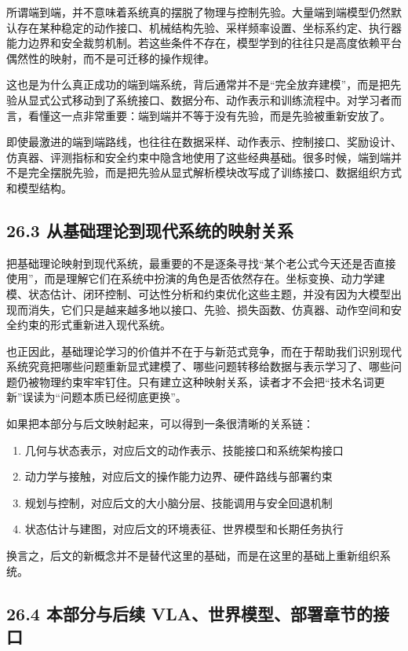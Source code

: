 所谓端到端，并不意味着系统真的摆脱了物理与控制先验。大量端到端模型仍然默认存在某种稳定的动作接口、机械结构先验、采样频率设置、坐标系约定、执行器能力边界和安全裁剪机制。若这些条件不存在，模型学到的往往只是高度依赖平台偶然性的映射，而不是可迁移的操作规律。

这也是为什么真正成功的端到端系统，背后通常并不是“完全放弃建模”，而是把先验从显式公式移动到了系统接口、数据分布、动作表示和训练流程中。对学习者而言，看懂这一点非常重要：端到端并不等于没有先验，而是先验被重新安放了。

即使最激进的端到端路线，也往往在数据采样、动作表示、控制接口、奖励设计、仿真器、评测指标和安全约束中隐含地使用了这些经典基础。很多时候，端到端并不是完全摆脱先验，而是把先验从显式解析模块改写成了训练接口、数据组织方式和模型结构。

\subsection*{26.3 从基础理论到现代系统的映射关系}


把基础理论映射到现代系统，最重要的不是逐条寻找“某个老公式今天还是否直接使用”，而是理解它们在系统中扮演的角色是否依然存在。坐标变换、动力学建模、状态估计、闭环控制、可达性分析和约束优化这些主题，并没有因为大模型出现而消失，它们只是越来越多地以接口、先验、损失函数、仿真器、动作空间和安全约束的形式重新进入现代系统。

也正因此，基础理论学习的价值并不在于与新范式竞争，而在于帮助我们识别现代系统究竟把哪些问题重新显式建模了、哪些问题转移给数据与表示学习了、哪些问题仍被物理约束牢牢钉住。只有建立这种映射关系，读者才不会把“技术名词更新”误读为“问题本质已经彻底更换”。

如果把本部分与后文映射起来，可以得到一条很清晰的关系链：

\begin{enumerate}
\item 几何与状态表示，对应后文的动作表示、技能接口和系统架构接口
\item 动力学与接触，对应后文的操作能力边界、硬件路线与部署约束
\item 规划与控制，对应后文的大小脑分层、技能调用与安全回退机制
\item 状态估计与建图，对应后文的环境表征、世界模型和长期任务执行
\end{enumerate}

换言之，后文的新概念并不是替代这里的基础，而是在这里的基础上重新组织系统。

\subsection*{26.4 本部分与后续 VLA、世界模型、部署章节的接口}


